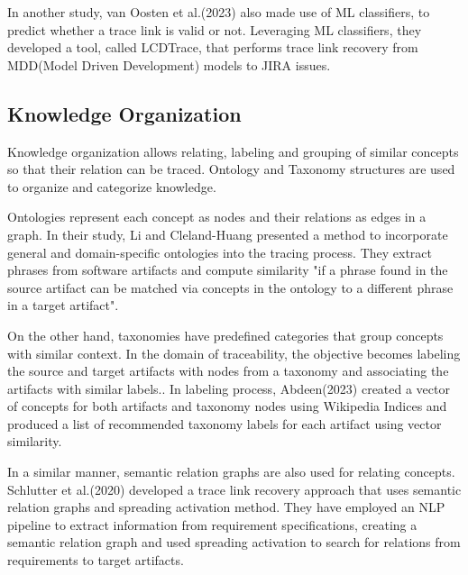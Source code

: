 In another study, van Oosten et al.(2023)\cite{VANOOSTEN2023107226} also made use of ML classifiers, to predict whether a trace link is valid or not. Leveraging ML classifiers, they developed a tool, called LCDTrace, that performs trace link recovery from MDD(Model Driven Development) models to JIRA issues.

\subsection{Knowledge Organization}

Knowledge organization allows relating, labeling and grouping of similar concepts so that their relation can be traced. Ontology and Taxonomy structures are used to organize and categorize knowledge.

Ontologies represent each concept as nodes and their relations as edges in a graph. In their study, Li and Cleland-Huang presented a method to incorporate general and domain-specific ontologies into the tracing process. They extract phrases from software artifacts and compute similarity "if a phrase found in the source artifact can be matched via concepts in the ontology to a different phrase in a target
artifact"\cite{Ontology}.

On the other hand, taxonomies have predefined categories that group concepts with similar context. In the domain of traceability, the objective becomes labeling the source and target artifacts with nodes from a taxonomy and associating the artifacts with similar labels.\cite{Taxonomy}. In labeling process, Abdeen(2023)\cite{abdeen-2023} created a vector of concepts for both artifacts and taxonomy nodes using Wikipedia Indices and produced a list of recommended taxonomy labels for each artifact using vector similarity.

In a similar manner, semantic relation graphs are also used for relating concepts. Schlutter et al.(2020)\cite{Spreading-Activation} developed a trace link recovery approach that uses semantic relation graphs and spreading activation method. They have employed an NLP pipeline to extract information from requirement specifications, creating a semantic relation graph and used spreading activation to search for relations from requirements to target artifacts.

